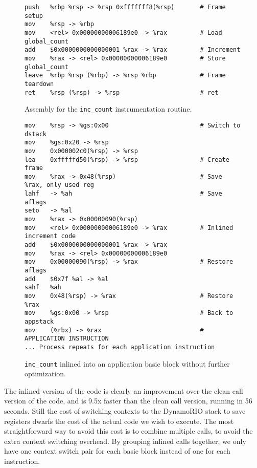 \begin{figure}
\begin{verbatim}
push   %rbp %rsp -> %rsp 0xfffffff8(%rsp)       # Frame setup
mov    %rsp -> %rbp 
mov    <rel> 0x00000000006189e0 -> %rax         # Load global_count
add    $0x0000000000000001 %rax -> %rax         # Increment
mov    %rax -> <rel> 0x00000000006189e0         # Store global_count
leave  %rbp %rsp (%rbp) -> %rsp %rbp            # Frame teardown
ret    %rsp (%rsp) -> %rsp                      # ret
\end{verbatim}
\caption{Assembly for the {\tt inc\_count} instrumentation routine.}
\label{fig:inc_count_asm}
\end{figure}

\begin{figure}
\begin{verbatim}
mov    %rsp -> %gs:0x00                         # Switch to dstack
mov    %gs:0x20 -> %rsp 
mov    0x000002c0(%rsp) -> %rsp 
lea    0xfffffd50(%rsp) -> %rsp                 # Create frame
mov    %rax -> 0x48(%rsp)                       # Save %rax, only used reg
lahf   -> %ah                                   # Save aflags
seto   -> %al 
mov    %rax -> 0x00000090(%rsp) 
mov    <rel> 0x00000000006189e0 -> %rax         # Inlined increment code
add    $0x0000000000000001 %rax -> %rax 
mov    %rax -> <rel> 0x00000000006189e0 
mov    0x00000090(%rsp) -> %rax                 # Restore aflags
add    $0x7f %al -> %al 
sahf   %ah 
mov    0x48(%rsp) -> %rax                       # Restore %rax
mov    %gs:0x00 -> %rsp                         # Back to appstack
mov    (%rbx) -> %rax                           # APPLICATION INSTRUCTION
... Process repeats for each application instruction
\end{verbatim}
\caption{{\tt inc\_count} inlined into an application basic block without
further optimization.}
\label{fig:inscount_inlined}
\end{figure}

The inlined version of the code is clearly an improvement over the clean call
version of the code, and is 9.5x faster than the clean call version, running in
56 seconds.  Still the cost of switching contexts to the DynamoRIO stack to
save registers dwarfs the cost of the actual code we wish to execute.  The most
straightforward way to avoid this cost is to combine multiple calls, to avoid
the extra context switching overhead.  By grouping inlined calls together, we
only have one context switch pair for each basic block instead of one for each
instruction.

